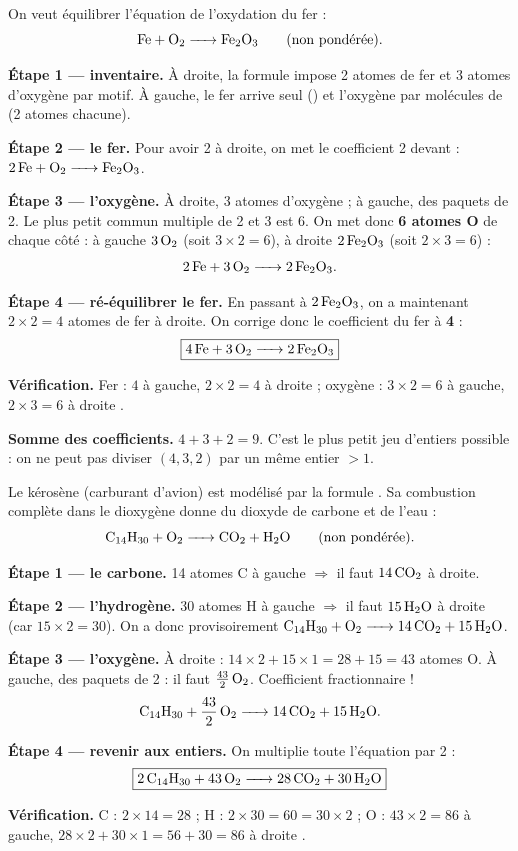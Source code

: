 \documentclass[11pt,a4paper]{article}
\begin{document}
\begin{exemple}
On veut équilibrer l'équation de l'oxydation du fer :
\[
\ce{Fe + O2 -> Fe2O3}\qquad\text{(non pondérée).}
\]

\textbf{Étape 1 — inventaire.} À droite, la formule  impose 2 atomes de fer et 3 atomes
d'oxygène par motif. À gauche, le fer arrive seul () et l'oxygène par molécules de 
(2 atomes chacune).

\textbf{Étape 2 — le fer.} Pour avoir 2  à droite, on met le coefficient 2 devant  :
$\ce{2 Fe + O2 -> Fe2O3}$.

\textbf{Étape 3 — l'oxygène.} À droite, 3 atomes d'oxygène ; à gauche, des paquets de 2. Le plus
petit commun multiple de 2 et 3 est 6. On met donc \textbf{6 atomes O} de chaque côté : à gauche
$3\,\ce{O2}$ (soit $3\times2=6$), à droite $2\,\ce{Fe2O3}$ (soit $2\times3=6$) :
\[
\ce{2 Fe + 3 O2 -> 2 Fe2O3}.
\]

\textbf{Étape 4 — ré-équilibrer le fer.} En passant à $2\,\ce{Fe2O3}$, on a maintenant $2\times2=4$
atomes de fer à droite. On corrige donc le coefficient du fer à \textbf{4} :
\[
\boxed{\ce{4 Fe + 3 O2 -> 2 Fe2O3}}
\]

\textbf{Vérification.} Fer : $4$ à gauche, $2\times2=4$ à droite \checkmark\; ; oxygène :
$3\times2=6$ à gauche, $2\times3=6$ à droite \checkmark.

\textbf{Somme des coefficients.} $4+3+2=\boxed{9}$. C'est le plus petit jeu d'entiers possible :
on ne peut pas diviser $(4,3,2)$ par un même entier $>1$.
\end{exemple}

\begin{exemple}
Le kérosène (carburant d'avion) est modélisé par la formule . Sa combustion complète
dans le dioxygène donne du dioxyde de carbone et de l'eau :
\[
\ce{C14H30 + O2 -> CO2 + H2O}\qquad\text{(non pondérée).}
\]

\textbf{Étape 1 — le carbone.} 14 atomes C à gauche $\Rightarrow$ il faut $14\,\ce{CO2}$ à droite.

\textbf{Étape 2 — l'hydrogène.} 30 atomes H à gauche $\Rightarrow$ il faut $15\,\ce{H2O}$ à droite
(car $15\times2=30$). On a donc provisoirement
$\ce{C14H30 + O2 -> 14 CO2 + 15 H2O}$.

\textbf{Étape 3 — l'oxygène.} À droite : $14\times2 + 15\times1 = 28+15 = 43$ atomes O. À gauche,
des paquets de 2 : il faut $\tfrac{43}{2}\,\ce{O2}$. Coefficient fractionnaire !
\[
\ce{C14H30 + 43/2 O2 -> 14 CO2 + 15 H2O}.
\]

\textbf{Étape 4 — revenir aux entiers.} On multiplie toute l'équation par 2 :
\[
\boxed{\ce{2 C14H30 + 43 O2 -> 28 CO2 + 30 H2O}}
\]

\textbf{Vérification.} C : $2\times14=28$ \checkmark\;; H : $2\times30=60=30\times2$ \checkmark\;;
O : $43\times2=86$ à gauche, $28\times2+30\times1=56+30=86$ à droite \checkmark.
\end{exemple}
\end{document}
